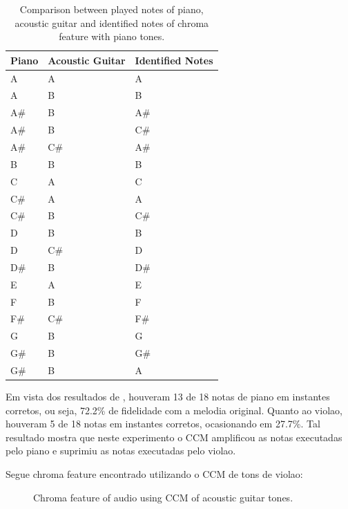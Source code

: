 \documentclass{article}
\begin{document}
	\begin{table}[h]
	 \begin{center}
	 \begin{tabular}{|l|l|l|}
	  \hline
	  Piano & Acoustic Guitar & Identified Notes \\
	  \hline
		A	& A	& A \\
		A	&    B	&    B \\
		A\#	&    B	&    A\# \\
		A\#	&    B	&    C\# \\
		A\#	&    C\#	&    A\# \\
		B	&    B	&    B \\
		C	&    A	&    C \\
		C\#	&    A	&    A \\
		C\#	&    B	&    C\# \\
		D	&    B	&    B \\
		D	&    C\#	&    D \\
		D\#	&    B	&    D\# \\
		E	&    A	&    E \\
		F	&    B	&    F \\
		F\#	&    C\#	&    F\# \\
		G	&    B	&    G \\
		G\#	&    B	&    G\# \\
		G\#	&    B	&    A \\
	  \hline
	 \end{tabular}
	\end{center}
	 \caption{Comparison between played notes of piano, acoustic guitar and identified notes of chroma feature with piano tones.}
	 \label{tab:table-2-ccm-piano}
	\end{table}

	
	Em vista dos resultados de , houveram 13 de 18 notas de piano em instantes corretos, ou seja, 72.2\% de fidelidade com a melodia original. Quanto ao violao, houveram 5 de 18 notas em instantes corretos, ocasionando em 27.7\%. Tal resultado mostra que neste experimento o CCM amplificou as notas executadas pelo piano e suprimiu as notas executadas pelo violao.



Segue chroma feature encontrado utilizando o CCM de tons de violao:
	
	\begin{figure}[h]
	 \centerline{}
	 \caption{Chroma feature of audio using CCM of acoustic guitar tones.}
	 \label{fig:2-ccm-violao}
	\end{figure}	
\end{document}
